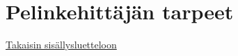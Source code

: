 \section{Pelinkehittäjän tarpeet}
\label{sec:tarpeet}
\hyperlink{index}{Takaisin sisällysluetteloon}